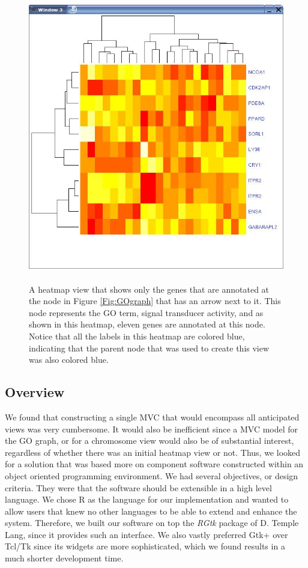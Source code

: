 \documentclass{article}[11pt]
\newcommand{\Rpackage}[1]{{\textit{#1}}}
\begin{document}
\begin{figure}[ht]
  \begin{center}
    \includegraphics[height=5in, width=5in]{heatmapsub.jpg}
    \caption{ A heatmap view that shows only the genes that are annotated at
      the node in Figure \ref{Fig:GOgraph} that has an arrow next to it.  This
      node represents the GO term, signal transducer activity, and as shown in
      this heatmap, eleven genes are annotated at this node.  Notice that all
      the labels in this heatmap are colored blue, indicating that the parent
      node that was used to create this view was also colored blue.  
     }
    \label{Fig:heatmapsub}
  \end{center}
\end{figure}

\subsection*{Overview}
\label{Ssec:Over}

We found that constructing a single MVC that would encompass all
anticipated views was very cumbersome. It would also be inefficient
since a MVC model for the GO graph, or for a chromosome view would
also be of substantial interest, regardless of whether there was an
initial heatmap view or not. Thus, we looked for a solution that was
based more on component software constructed within an object oriented
programming environment.
We had several objectives, or design criteria. They were that the
software should be extensible in a high level language. We chose R as
the language for our implementation and wanted to allow users that
knew no other languages to be able to extend and enhance the
system.  Therefore, we built our software on top the \Rpackage{RGtk} package of
D. Temple Lang, since it provides such an interface. We also vastly
preferred Gtk+ over Tcl/Tk since its widgets are more sophisticated,
which we found results in a much shorter development time.
\end{document}
